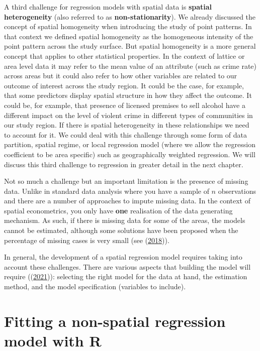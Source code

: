 \documentclass[
  krantz2]{krantz}
\begin{document}
A third challenge for regression models with spatial data is \textbf{spatial heterogeneity} (also referred to as \textbf{non-stationarity}). We already discussed the concept of spatial homogeneity when introducing the study of point patterns. In that context we defined spatial homogeneity as the homogeneous intensity of the point pattern across the study surface. But spatial homogeneity is a more general concept that applies to other statistical properties. In the context of lattice or area level data it may refer to the mean value of an attribute (such as crime rate) across areas but it could also refer to how other variables are related to our outcome of interest across the study region. It could be the case, for example, that some predictors display spatial structure in how they affect the outcome. It could be, for example, that presence of licensed premises to sell alcohol have a different impact on the level of violent crime in different types of communities in our study region. If there is spatial heterogeneity in these relationships we need to account for it. We could deal with this challenge through some form of data partition, spatial regime, or local regression model (where we allow the regression coefficient to be area specific) such as geographically weighted regression. We will discuss this third challenge to regression in greater detail in the next chapter.

Not so much a challenge but an important limitation is the presence of missing data. Unlike in standard data analysis where you have a sample of \(n\) observations and there are a number of approaches to impute missing data. In the context of spatial econometrics, you only have \textbf{one} realisation of the data generating mechanism. As such, if there is missing data for some of the areas, the models cannot be estimated, although some solutions have been proposed when the percentage of missing cases is very small (see (\protect\hyperlink{ref-Floch_2018}{2018})).

In general, the development of a spatial regression model requires taking into account these challenges. There are various aspects that building the model will require ((\protect\hyperlink{ref-Kopczewska_2021}{2021})): selecting the right model for the data at hand, the estimation method, and the model specification (variables to include).

\hypertarget{fitting-a-non-spatial-regression-model-with-r}{%
\section{Fitting a non-spatial regression model with R}\label{fitting-a-non-spatial-regression-model-with-r}}
\end{document}
